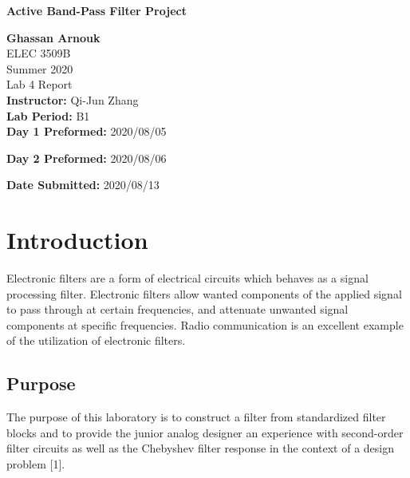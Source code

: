 \documentclass[hidelinks]{article}
\begin{document}
	\begin{titlepage}
		\begin{center}
			\vspace{1cm}
			{\LARGE\textbf{Active Band-Pass Filter Project}}
			
			\vspace{1.5cm}
			\textbf{\large Ghassan Arnouk}\\
			
			\vspace{1cm}
			\large ELEC 3509B\\
			\large Summer 2020\\
			\large Lab 4 Report\\
			
			
			\vspace{2cm}
			\textbf{Instructor:} Qi-Jun Zhang\\
			
			
			\vspace{1cm}
			\textbf{Lab Period:} B1\\
			
			\vspace{0.1cm}
			\textbf{Day 1 Preformed:} 2020/08/05
			
			\vspace{0.1cm}
			\textbf{Day 2 Preformed:} 2020/08/06
			
			\vspace{1cm}
			\textbf{Date Submitted:} 2020/08/13\\			
		\end{center}
	\end{titlepage}
	
	\pagebreak
	
	\tableofcontents
	\pagebreak
	
	\listoftables
	\pagebreak
	
	\listoffigures
	\pagebreak
	
	\section{Introduction}
	Electronic filters are a form of electrical circuits which behaves as a signal processing filter.
	Electronic filters allow wanted components of the applied signal to pass through at certain frequencies, and attenuate unwanted signal components at specific frequencies. 
	Radio communication is an excellent example of the utilization of electronic filters. 
	\subsection{Purpose}
	The purpose of this laboratory is to construct a filter from standardized filter blocks and to provide the junior analog designer an experience with second-order filter circuits as well as the Chebyshev filter response in the context of a design problem [1].
\end{document}
